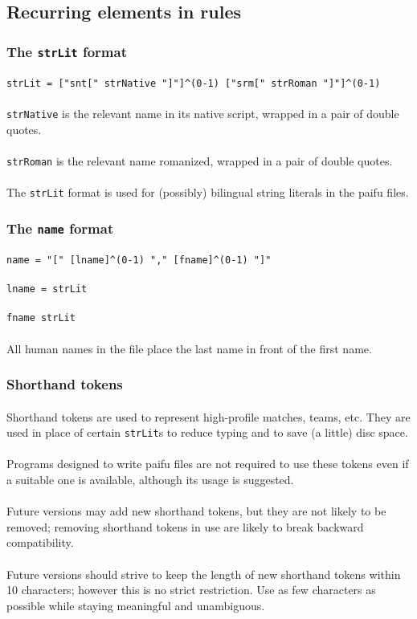 \documentclass[%
	a4paper%
	,10pt%
	,twoside%
	,notitlepage%
]{article}%
\newcommand*{\ruleSymbol}{\textjapanese{⚠}}%
\newcommand*{\ruleMargin}{\marginpar{\flushright{}\ruleSymbol{}}}%
\newcommand*{\rulePar}{\paragraph*{\ruleMargin{}}}%
\begin{document}
	\subsection{Recurring elements in rules}\label{subsec:recur}%
		\subsubsection{The \texttt{strLit} format}\label{subsubsec:strlit}%
			\rulePar{}\lstinline/strLit = ["snt[" strNative "]"]^(0-1) ["srm[" strRoman "]"]^(0-1)/%
			\rulePar{}\lstinline/strNative/ is the relevant name in its native script, wrapped in a pair of double quotes. %
			\rulePar{}\lstinline/strRoman/ is the relevant name romanized, wrapped in a pair of double quotes. %
			\paragraph*{}The \lstinline/strLit/ format is used for (possibly) bilingual string literals in the paifu files. %
		\subsubsection{The \texttt{name} format}\label{subsubsec:name}%
			\rulePar{}\lstinline/name = "[" [lname]^(0-1) "," [fname]^(0-1) "]"/%
			\rulePar{}\lstinline/lname = strLit/%
			\rulePar{}\lstinline/fname strLit/%
			\paragraph*{}All human names in the file place the last name in front of the first name. %
		\subsubsection{Shorthand tokens}\label{subsubsec:shtkn}%
			\paragraph*{}Shorthand tokens are used to represent high-profile matches, teams, etc. They are used in place of certain \lstinline/strLit/s to reduce typing and to save (a little) disc space. %
			\rulePar{}Programs designed to write paifu files are not required to use these tokens even if a suitable one is available, although its usage is suggested. %
			\rulePar{}Future versions may add new shorthand tokens, but they are not likely to be removed; removing shorthand tokens in use are likely to break backward compatibility. %
			\rulePar{}Future versions should strive to keep the length of new shorthand tokens within 10 characters; however this is no strict restriction. Use as few characters as possible while staying meaningful and unambiguous. %
\end{document}
